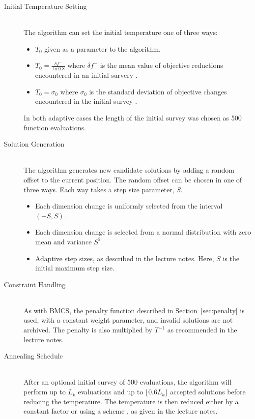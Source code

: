 \documentclass[10pt]{article}
\begin{document}
\begin{description}
  \item[Initial Temperature Setting] \hfill \\
    The algorithm can set the initial temperature one of three ways:
    \begin{itemize}
      \item $T_0$ given as a parameter to the algorithm.
      \item $\displaystyle T_0 = \frac{\delta f^-}{\ln 0.8}$ where $\delta f^-$ is
        the mean value of objective reductions encountered in an initial
        survery \cite{kirk}.
      \item $T_0 = \sigma_0$ where $\sigma_0$ is the standard deviation of
        objective changes encountered in the initial survey \cite{white:261}.
    \end{itemize}
    In both adaptive cases the length of the initial survey was chosen as 500
    function evaluations.

  \item[Solution Generation] \hfill \\
    The algorithm generates new candidate solutions by adding a random offset
    to the current position. The random offset can be chosen in one of three
    ways. Each way takes a step size parameter, $S$.
    \begin{itemize}
      \item Each dimension change is uniformly selected from the interval
        $(-S, S)$.
      \item Each dimension change is selected from a normal distribution with
        zero mean and variance $S^2$.
      \item Adaptive step sizes\cite{parks}, as
        described in the lecture notes. Here, $S$ is the initial maximum step
        size.
    \end{itemize}

  \item[Constraint Handling] \hfill \\
    As with BMCS, the penalty function described in Section~\ref{sec:penalty}
    is used, with a constant weight parameter, and invalid solutions are not
    archived. The penalty is also multiplied by $T^{-1}$ as recommended in the
    lecture notes.

  \item[Annealing Schedule] \hfill \\
    After an optional initial survey of 500 evaluations, the algorithm will
    perform up to $L_k$ evaluations and up to $\lfloor 0.6 L_k \rfloor$
    accepted solutions before reducing the temperature.  The temperature is
    then reduced either by a constant factor \cite{kirk82} or using a scheme
    \cite{huang86}, as given in the lecture notes.


\end{description}
\end{document}
